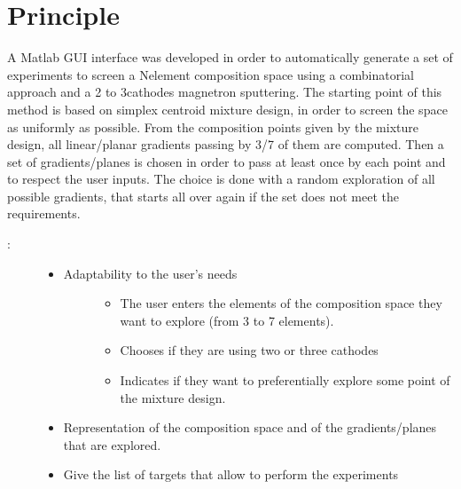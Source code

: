 \documentclass[letterpaper,10pt,english]{sphinxmanual}
\begin{document}
\section{Principle}
\label{\detokenize{ExperimentsPlannification:principle}}
\sphinxAtStartPar
A Matlab GUI interface was developed in order to automatically generate a set of experiments to screen a N\sphinxhyphen{}element composition space using a combinatorial approach and a 2\sphinxhyphen{} to 3\sphinxhyphen{}cathodes magnetron sputtering. The starting point of this method is based on simplex centroid mixture design, in order to screen the space as uniformly as possible. From the composition points given by the mixture design, all linear/planar gradients passing by 3/7 of them are computed. Then a set of gradients/planes is chosen in order to pass at least once by each point and to respect the user inputs. The choice is done with a random exploration of all possible gradients, that starts all over again if the set does not meet the requirements.
\begin{description}
\item[{ :}] \leavevmode\begin{itemize}
\item {} \begin{description}
\item[{Adaptability to the user’s needs}] \leavevmode\begin{itemize}
\item {} 
\sphinxAtStartPar
The user enters the elements of the composition space they want to explore (from 3 to 7 elements).

\item {} 
\sphinxAtStartPar
Chooses if they are using two or three cathodes

\item {} 
\sphinxAtStartPar
Indicates if they want to preferentially explore some point of the mixture design.

\end{itemize}

\end{description}

\item {} 
\sphinxAtStartPar
Representation of the composition space and of the gradients/planes that are explored.

\item {} 
\sphinxAtStartPar
Give the list of targets that allow to perform the experiments

\end{itemize}

\end{description}
\end{document}
